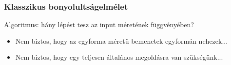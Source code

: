 \begin{frame}[t]
\frametitle{Klasszikus bonyolultságelmélet}

Algoritmus: hány lépést tesz az input méretének függvényében?

\begin{itemize}
\item Nem biztos, hogy az egyforma méretű bemenetek egyformán nehezek...
\item Nem biztos, hogy egy teljesen általános megoldásra van szükségünk...
\end{itemize}

\end{frame}

